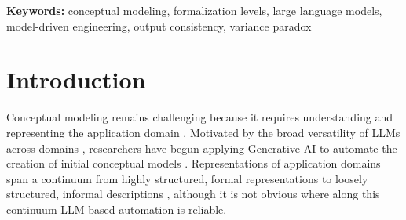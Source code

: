 \documentclass[runningheads]{llncs}
\begin{document}
\begin{abstract}
\end{abstract}

\textbf{Keywords:} conceptual modeling, formalization levels, large language models, model-driven engineering, output consistency, variance paradox

\section{Introduction}
\label{sec:intro}
\sloppy

Conceptual modeling remains challenging because it requires understanding and representing the application domain \cite{mylopoulos1992conceptual,olive2007conceptual}. Motivated by the broad versatility of LLMs across domains \cite{bommasani2021opportunities,brown2020language}, researchers have begun applying Generative AI to automate the creation of initial conceptual models \cite{camara2023assessment,fill2023conceptual,haerer2023conceptual,DBLP:conf/er/SilvaMCKP25,Storey2025}.  Representations of application domains span a continuum from highly structured, formal representations to loosely structured, informal descriptions \cite{mylopoulos1992conceptual}, although it is not obvious where along this continuum LLM-based automation is reliable.
\end{document}
